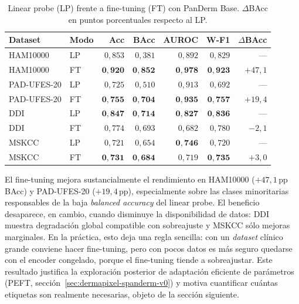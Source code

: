 \begin{table}[htbp]
\centering
\footnotesize
\setlength{\tabcolsep}{4pt}
\renewcommand{\arraystretch}{0.95}
\caption{Linear probe (LP) frente a fine-tuning (FT) con PanDerm
Base. $\Delta$BAcc en puntos porcentuales respecto al LP.}
\label{tab:ft-panderm}
\begin{tabular}{llrrrrr}
\hline
Dataset      & Modo & Acc           & BAcc          & AUROC         & W-F1          & $\Delta$BAcc \\
\hline
HAM10000     & LP   & $0{,}853$     & $0{,}381$     & $0{,}892$     & $0{,}829$     & --- \\
HAM10000     & FT   & $\mathbf{0{,}920}$ & $\mathbf{0{,}852}$ & $\mathbf{0{,}978}$ & $\mathbf{0{,}923}$ & $+47{,}1$ \\
PAD-UFES-20  & LP   & $0{,}725$     & $0{,}510$     & $0{,}913$     & $0{,}692$     & --- \\
PAD-UFES-20  & FT   & $\mathbf{0{,}755}$ & $\mathbf{0{,}704}$ & $\mathbf{0{,}935}$ & $\mathbf{0{,}757}$ & $+19{,}4$ \\
DDI          & LP   & $\mathbf{0{,}847}$ & $\mathbf{0{,}714}$ & $\mathbf{0{,}827}$ & $\mathbf{0{,}836}$ & --- \\
DDI          & FT   & $0{,}774$     & $0{,}693$     & $0{,}682$     & $0{,}780$     & $-2{,}1$ \\
MSKCC        & LP   & $0{,}721$     & $0{,}654$     & $\mathbf{0{,}746}$ & $0{,}720$     & --- \\
MSKCC        & FT   & $\mathbf{0{,}731}$ & $\mathbf{0{,}684}$ & $0{,}719$     & $\mathbf{0{,}735}$ & $+3{,}0$ \\
\hline
\end{tabular}
\end{table}

El fine-tuning mejora sustancialmente el rendimiento en HAM10000
($+47{,}1$\,pp BAcc) y PAD-UFES-20 ($+19{,}4$\,pp), especialmente
sobre las clases minoritarias responsables de la baja \emph{balanced
accuracy} del linear probe. El beneficio desaparece, en cambio, cuando
disminuye la disponibilidad de datos: DDI muestra degradación global
compatible con sobreajuste y MSKCC sólo mejoras marginales. En la práctica, esto deja una regla sencilla: con un \emph{dataset}
clínico grande conviene hacer fine-tuning, pero con pocos datos
es más seguro quedarse con el encoder congelado, porque el
fine-tuning tiende a sobreajustar. Este resultado justifica la
exploración posterior de adaptación eficiente de parámetros (PEFT,
sección~\ref{sec:dermapixel-spanderm-v0}) y motiva cuantificar cuántas
etiquetas son realmente necesarias, objeto de la sección siguiente.

